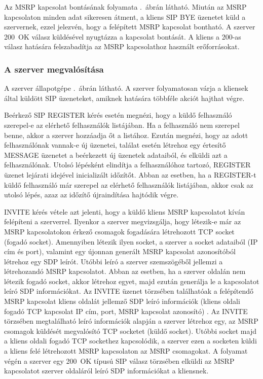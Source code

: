Az MSRP kapcsolat bontásának folyamata .~ábrán látható. Miután az MSRP kapcsolaton minden adat sikeresen átment, a kliens SIP BYE üzenetet küld a szervernek, ezzel jelezvén, hogy a felépített MSRP kapcsolat bontható. A szerver 200~OK válasz küldésével nyugtázza a kapcsolat bontását. A kliens a 200-as válasz hatására felszabadítja az MSRP kapcsolathoz használt erőforrásokat.

\subsubsection{A szerver megvalósítása}
\label{sec:szervermegvalositas}

A szerver állapotgépe .~ábrán látható. A szerver folyamatosan várja a kliensek által küldött SIP üzeneteket, amiknek hatására többféle akciót hajthat végre.

Beérkező SIP REGISTER kérés esetén megnézi, hogy a küldő felhasználó szerepel-e az elérhető felhasználók listájában. Ha a felhasználó nem szerepel benne, akkor a szerver hozzáadja őt a listához. Ezután megnézi, hogy az adott felhasználónak vannak-e új üzenetei, találat esetén létrehoz egy értesítő MESSAGE üzenetet a beérkezett új üzenetek adataiból, és elküldi azt a felhasználónak. Utolsó lépésként elindítja a felhasználóhoz tartozó, REGISTER üzenet lejárati idejével inicializált időzítőt. Abban az esetben, ha a REGISTER-t küldő felhasználó már szerepel az elérhető felhasználók listájában, akkor csak az utolsó lépés, azaz az időzítő újraindítása hajtódik végre.

INVITE kérés vétele azt jelenti, hogy a küldő kliens MSRP kapcsolatot kíván felépíteni a szerverrel. Ilyenkor a szerver megvizsgálja, hogy létezik-e már az MSRP kapcsolatokon érkező csomagok fogadására létrehozott TCP socket (fogadó socket). Amennyiben létezik ilyen socket, a szerver a socket adataiból (IP cím és port), valamint egy újonnan generált MSRP kapcsolat azonosítóból létrehoz egy SDP leírót. Utóbbi leíró a szerver szemszögéből jellemzi a létrehozandó MSRP kapcsolatot. Abban az esetben, ha a szerver oldalán nem létezik fogadó socket, akkor létrehoz egyet, majd ezután generálja le a kapcsolatot leíró SDP információkat.  Az INVITE üzenet törzsében találhatóak a felépítendő MSRP kapcsolat kliens oldalát jellemző SDP leíró információk (kliens oldali fogadó TCP kapcsolat IP cím, port, MSRP kapcsolat azonosító) . Az INVITE törzsében megtalálható leíró információk alapján a szerver létrehoz egy, az MSRP csomagok küldését megvalósító TCP socketet (küldő socket). Utóbbi socket majd a kliens oldali fogadó TCP sockethez kapcsolódik, a szerver ezen a socketen küldi a kliens felé létrehozott MSRP kapcsolaton az MSRP csomagokat. A folyamat végén a szerver egy 200~OK típusú SIP válasz törzsében elküldi az MSRP kapcsolatot szerver oldaláról leíró SDP információkat a kliensnek.

